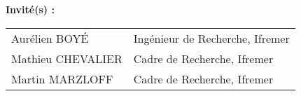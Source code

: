 {\vspace{\baselineskip}
{\normalTwelve \textbf{Invit\'{e}(s) :}}\\ \newline
\footnotesizeTwelve
\begin{tabular}{@{}ll}
Aurélien BOY\'{E} & Ingénieur de Recherche, Ifremer \\
Mathieu CHEVALIER & Cadre de Recherche, Ifremer \\
Martin MARZLOFF & Cadre de Recherche, Ifremer \\
\end{tabular}
}


\maketitle
